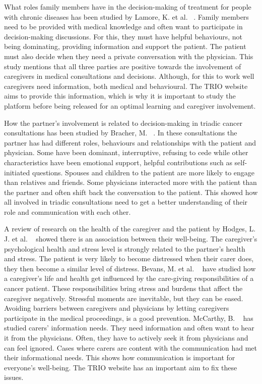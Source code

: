 \documentclass{sigchi}
\begin{document}
What roles family members have in the decision-making of treatment for people with chronic diseases has been studied by Lamore, K. et al. ~\cite{Lamore2017}. Family members need to be provided with medical knowledge and often want to participate in decision-making discussions. For this, they must have helpful behaviours, not being dominating, providing information and support the patient. The patient must also decide when they need a private conversation with the physician. This study mentions that all three parties are positive towards the involvement of caregivers in medical consultations and decisions. Although, for this to work well caregivers need information, both medical and behavioural. The TRIO website aims to provide this information, which is why it is important to study the platform before being released for an optimal learning and caregiver involvement. 

How the partner’s involvement is related to decision-making in triadic cancer consultations has been studied by Bracher, M. ~\cite{Bracher2019}. In these consultations the partner has had different roles, behaviours and relationships with the patient and physician. Some have been dominant, interruptive, refusing to cede while other characteristics have been emotional support, helpful contributions such as self-initiated questions. Spouses and children to the patient are more likely to engage than relatives and friends. Some physicians interacted more with the patient than the partner and often shift back the conversation to the patient. This showed how all involved in triadic consultations need to get a better understanding of their role and communication with each other.

A review of research on the health of the caregiver and the patient by Hodges, L. J. et al. ~\cite{Hodges2005} showed there is an association between their well-being. The caregiver’s psychological health and stress level is strongly related to the partner’s health and stress. The patient is very likely to become distressed when their carer does, they then become a similar level of distress. Bevans, M. et al. ~\cite{Bevans2012} have studied how a caregiver’s life and health get influenced by the care-giving responsibilities of a cancer patient. These responsibilities bring stress and burdens that affect the caregiver negatively. Stressful moments are inevitable, but they can be eased. Avoiding barriers between caregivers and physicians by letting caregivers participate in the medical proceedings, is a good prevention. McCarthy, B. ~\cite{McCarthy2011} has studied carers’ information needs. They need information and often want to hear it from the physicians. Often, they have to actively seek it from physicians and can feel ignored. Cases where carers are content with the communication had met their informational needs. This shows how communication is important for everyone’s well-being. The TRIO website has an important aim to fix these issues.  
\end{document}
